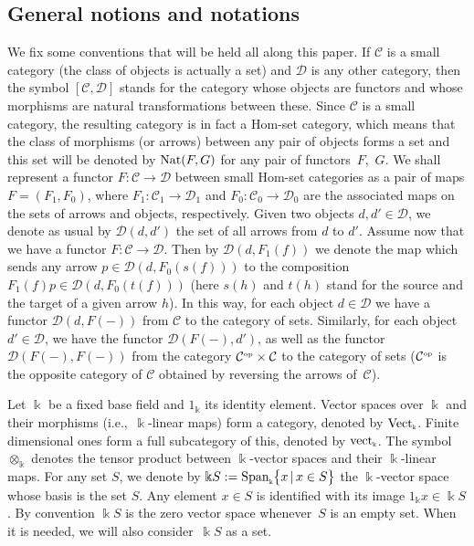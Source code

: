 \documentclass[10pt,a4paper]{amsart}
\numberwithin{equation}{section}
\newcommand{\tensor}[1]{\otimes_{\scriptscriptstyle{#1}}}
\newcommand{\Vect}{{\rm Vect}_{\Sscript{\Bbbk}}}
\newcommand{\vect}{{\rm vect}_{\Sscript{\Bbbk}}}
\newcommand{\Co}{\mathcal{C}_{\Sscript{0}}}
\newcommand{\Ca}{\mathcal{C}_{\Sscript{1}}}
\newcommand{\Do}{\cD_{\Sscript{0}}}
\newcommand{\Da}{\cD_{\Sscript{1}}}
\newcommand{\Fo}{F_{\Sscript{0}}}
\newcommand{\Fa}{F_{\Sscript{1}}}
\newcommand{\cD}{{\mathcal D}}
\newcommand{\Sscript}[1]{\scriptscriptstyle{#1}}
\begin{document}
\vspace{-1.2mm}

\subsection{General notions and notations}\label{ssec:notation}

We fix some conventions that will be held all along this paper. If $\mathcal{C}$ is a small category (the class of objects is actually a set) and $\cD$ is any other category, then the symbol $[\mathcal{C}, \cD]$ stands for the category whose objects are functors and whose morphisms are natural transformations between these. Since $\mathcal{C}$ is a small category, the resulting category is in fact a Hom-set category, which means that the class of morphisms (or arrows) between any pair of objects forms a set and this set will be denoted by ${\rm Nat}(F,G)$ for any pair of functors~$F$,~$G$. We shall represent a functor $F \colon \mathcal{C} \to \cD$ between small Hom-set categories as a pair of maps $F=(\Fa,\Fo)$, where $\Fa\colon \Ca \to \Da$ and $\Fo\colon \Co \to \Do$ are the associated maps on the sets of arrows and objects, respectively. Given two objects $d,d' \in \cD$, we denote as usual by $\cD(d,d')$ the set of all arrows from $d$ to $d'$. Assume now that we have a functor $F\colon \mathcal{C} \to \cD$. Then by $\cD(d,\Fa(f))$ we denote the map which sends any arrow $p \in \cD(d, F_{\Sscript{0}}(s(f)))$ to the composition $\Fa(f)p \in \cD(d,F_{\Sscript{0}}(t(f)))$ (here $s(h)$ and $t(h)$ stand for the source and the target of a given arrow $h$). In this way, for each object $d \in \cD$ we have a functor $\cD(d,F(-))$ from $\mathcal{C}$ to the category of sets. Similarly, for each object $d' \in \cD$, we have the functor $\cD(F(-), d')$, as well as the functor $\cD(F(-), F(-))$ from the category $\mathcal{C}^{\Sscript{\rm op}} \times \mathcal{C}$ to the category of sets ($\mathcal{C}^{\Sscript{\rm op}}$ is the opposite category of $\mathcal{C}$ obtained by reversing the arrows of~$\mathcal{C}$).

Let $\Bbbk$ be a fixed base field and $1_{\Sscript{\Bbbk}}$ its identity element. Vector spaces over $\Bbbk$ and their morphisms (i.e.,~$\Bbbk$-linear maps) form a category, denoted by $\Vect$. Finite dimensional ones form a full subcategory of this, denoted by $\vect$. The symbol $\tensor{\Bbbk}$ denotes the tensor product between $\Bbbk$-vector spaces and their $\Bbbk$-linear maps. For any set $S$, we denote by $\Bbbk S:={\rm Span}_{\Sscript{\Bbbk}}\big\{x \,|\, x \in S \big\}$ the $\Bbbk$-vector space whose basis is the set $S$. Any element $x \in S$ is identified with its image $1_{\Sscript{\Bbbk}} x \in \Bbbk S$. By convention $\Bbbk S$ is the zero vector space whenever~$S$ is an empty set. When it is needed, we will also consider~$\Bbbk S$ as a set.
\end{document}
